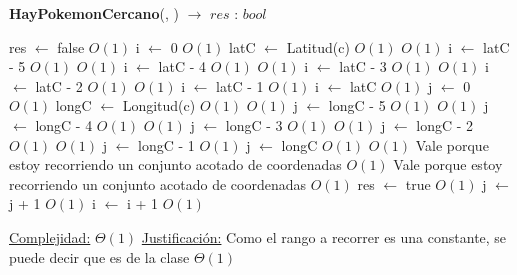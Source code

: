  \begin{algorithm}[H]{\textbf{HayPokemonCercano}(, ) $\to$ $res$ : $bool$} 
	\begin{algorithmic}
		\State res $\gets$ false	\Comment $O(1)$ 
		\State i $\gets$ 0 \Comment $O(1)$
		\State latC $\gets$ Latitud(c)	\Comment $O(1)$
			\Comment $O(1)$
			\State i $\gets$ latC - 5	\Comment $O(1)$
		\Else
				\Comment $O(1)$
				\State i $\gets$ latC - 4	\Comment $O(1)$
			\Else
					\Comment $O(1)$
					\State i $\gets$ latC - 3	\Comment $O(1)$
				\Else
						\Comment $O(1)$
						\State i $\gets$ latC - 2	\Comment $O(1)$
					\Else
							\Comment $O(1)$
							\State i $\gets$ latC - 1	\Comment $O(1)$
						\Else
							\State i $\gets$ latC	\Comment $O(1)$
						\EndIf								
					\EndIf
				\EndIf
			\EndIf
		\EndIf
		\State j $\gets$ 0 \Comment $O(1)$
		\State longC $\gets$ Longitud(c)	\Comment $O(1)$
			\Comment $O(1)$
			\State j $\gets$ longC - 5	\Comment $O(1)$
		\Else
				\Comment $O(1)$
				\State j $\gets$ longC - 4	\Comment $O(1)$
			\Else
					\Comment $O(1)$
					\State j $\gets$ longC - 3	\Comment $O(1)$
				\Else
						\Comment $O(1)$
						\State j $\gets$ longC - 2	\Comment $O(1)$
					\Else
							\Comment $O(1)$
							\State j $\gets$ longC - 1	\Comment $O(1)$
						\Else
							\State j $\gets$ longC	\Comment $O(1)$
						\EndIf								
					\EndIf
				\EndIf
			\EndIf
		\EndIf
			\Comment $O(1)$ {Vale porque estoy recorriendo un conjunto acotado de coordenadas}
				\Comment $O(1)$ {Vale porque estoy recorriendo un conjunto acotado de coordenadas}
					\Comment $O(1)$
					\State res $\gets$ true	\Comment $O(1)$ 
				\EndIf
				\State j $\gets$ j + 1	\Comment $O(1)$
			\EndWhile
			\State i $\gets$ i + 1	\Comment $O(1)$
		\EndWhile
	
		\medskip
		\Statex \underline{Complejidad:} $\Theta(1)$
		\Statex \underline{Justificación:} Como el rango a recorrer es una constante, se puede decir que es de la clase $\Theta(1)$
     \end{algorithmic}
 \end{algorithm}

